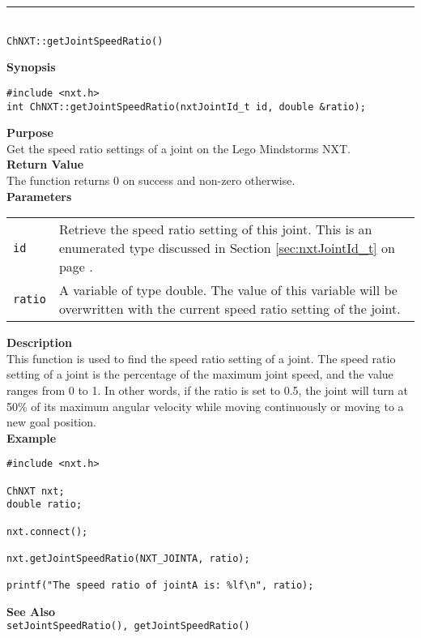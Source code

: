 \noindent
\vspace{5pt}
\rule{4.5in}{0.015in}\\
\noindent
{\LARGE \texttt{ChNXT::getJointSpeedRatio()}}\\
{}

\noindent
{\bf Synopsis}
\begin{lstlisting}
#include <nxt.h>
int ChNXT::getJointSpeedRatio(nxtJointId_t id, double &ratio);
\end{lstlisting}

\noindent
{\bf Purpose}\\
Get the speed ratio settings of a joint on the Lego Mindstorms NXT.\\

\noindent
{\bf Return Value}\\
The function returns 0 on success and non-zero otherwise.\\

\noindent
{\bf Parameters}
\vspace{-0.1in}
\begin{description}
\item               
\begin{tabular}{p{10 mm}p{145 mm}}
\texttt{id} & Retrieve the speed ratio setting of this joint. This is an 
enumerated type discussed in Section \ref{sec:nxtJointId_t} on page
\pageref{sec:nxtJointId_t}.\\
\texttt{ratio} & A variable of type double. The value of this variable will
be overwritten with the current speed ratio setting of the joint.
\end{tabular}
\end{description}

\noindent
{\bf Description}\\
This function is used to find the speed ratio setting of a joint. The speed
ratio setting of a joint is the percentage of the maximum joint speed, and the
value ranges from 0 to 1. In other words, if the ratio is set to 0.5, the joint 
will turn at 50\% of its maximum angular velocity while moving continuously
or moving to a new goal position.\\

\noindent
{\bf Example}
\begin{lstlisting}
#include <nxt.h>

ChNXT nxt;
double ratio;

nxt.connect();

nxt.getJointSpeedRatio(NXT_JOINTA, ratio);

printf("The speed ratio of jointA is: %lf\n", ratio);
\end{lstlisting}

\noindent
{\bf See Also}\\
\texttt{setJointSpeedRatio(), getJointSpeedRatio()}

